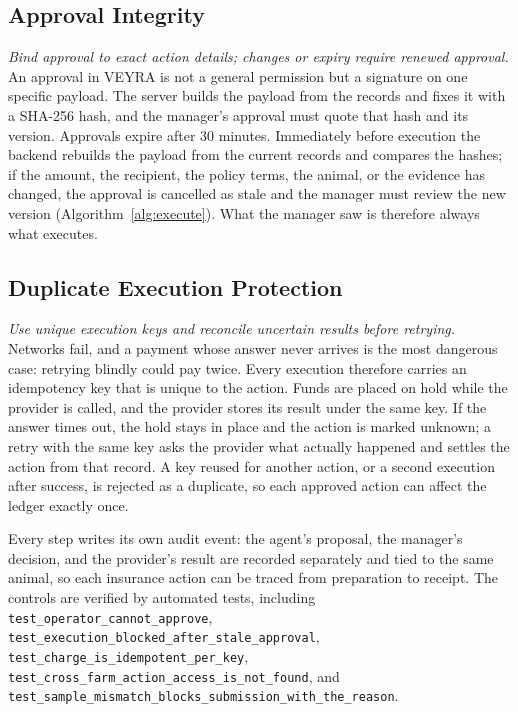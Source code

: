 \documentclass[11pt,letterpaper]{article}
\begin{document}
\subsection{Approval Integrity}

\emph{Bind approval to exact action details; changes or expiry require renewed approval.} An approval in VEYRA is not a general permission but a signature on one specific payload. The server builds the payload from the records and fixes it with a SHA-256 hash, and the manager's approval must quote that hash and its version. Approvals expire after 30 minutes. Immediately before execution the backend rebuilds the payload from the current records and compares the hashes; if the amount, the recipient, the policy terms, the animal, or the evidence has changed, the approval is cancelled as stale and the manager must review the new version (Algorithm~\ref{alg:execute}). What the manager saw is therefore always what executes.

\subsection{Duplicate Execution Protection}

\emph{Use unique execution keys and reconcile uncertain results before retrying.} Networks fail, and a payment whose answer never arrives is the most dangerous case: retrying blindly could pay twice. Every execution therefore carries an idempotency key that is unique to the action. Funds are placed on hold while the provider is called, and the provider stores its result under the same key. If the answer times out, the hold stays in place and the action is marked unknown; a retry with the same key asks the provider what actually happened and settles the action from that record. A key reused for another action, or a second execution after success, is rejected as a duplicate, so each approved action can affect the ledger exactly once.

Every step writes its own audit event: the agent's proposal, the manager's decision, and the provider's result are recorded separately and tied to the same animal, so each insurance action can be traced from preparation to receipt. The controls are verified by automated tests, including \texttt{test\_\allowbreak{}operator\_\allowbreak{}cannot\_\allowbreak{}approve}, \texttt{test\_\allowbreak{}execution\_\allowbreak{}blocked\_\allowbreak{}after\_\allowbreak{}stale\_\allowbreak{}approval}, \texttt{test\_\allowbreak{}charge\_\allowbreak{}is\_\allowbreak{}idempotent\_\allowbreak{}per\_\allowbreak{}key}, \texttt{test\_\allowbreak{}cross\_\allowbreak{}farm\_\allowbreak{}action\_\allowbreak{}access\_\allowbreak{}is\_\allowbreak{}not\_\allowbreak{}found}, and \texttt{test\_\allowbreak{}sample\_\allowbreak{}mismatch\_\allowbreak{}blocks\_\allowbreak{}submission\_\allowbreak{}with\_\allowbreak{}the\_\allowbreak{}reason}.
\end{document}
